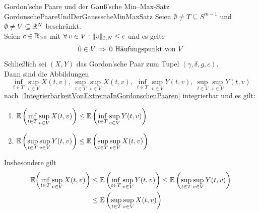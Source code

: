 \begin{satz}{Gordon'sche Paare und der Gauß'sche Min--Max-Satz}
            {GordonschePaareUndDerGaussscheMinMaxSatz}
Seien $\emptyset \neq T \subseteq S^{m-1}$ und 
$\emptyset\neq V \subseteq \mathbb{R}^N$ beschränkt.\\
Seien $c \in \mathbb{R}_{>0}$ mit $\forall\, v \in V: \lVert v\rVert _{2,N} \le c$ und es gelte
\[0 \in V \, \Rightarrow \, 0 \text{ Häufungspunkt von }V\]
Schließlich sei $(X,Y)$ das Gordon'sche Paar zum Tupel $(\gamma,\delta,g,c)$.\\
Dann sind die Abbildungen
\[\inf_{t \in T}\sup_{v \in V}X(t, v),\  \sup_{t \in T}\sup_{v \in V}X(t, v),\ 
\inf_{t \in T}\sup_{v \in V}Y(t, v),\  \sup_{t \in T}\sup_{v \in V}Y(t, v)\]
nach~\ref{IntegrierbarkeitVonExtremaInGordonschenPaaren} integrierbar und es
gilt:
\begin{enumerate}[(1)]
	\item \label{GordonschePaareUndDerGaussscheMinMaxSatz1}
	$  \mathbb{E}\left(\underset{t \in T}\inf\,\underset{v\in V}\sup\,X(t, v)\right)
	\le\mathbb{E}\left(\underset{t \in T}\inf\,\underset{v\in V}\sup\,Y(t, v)\right)$
	\item \label{GordonschePaareUndDerGaussscheMinMaxSatz2}
	$  \mathbb{E}\left(\underset{t \in T}\sup\,\underset{v\in V}\sup\,Y(t, v)\right)
	\le\mathbb{E}\left(\underset{t \in T}\sup\,\underset{v\in V}\sup\,X(t, v)\right)$
\end{enumerate}
Insbesondere gilt
\begin{align*}
\mathbb{E}\bigg(\underset{t \in T}\inf\,\underset{v\in V}\sup\,X(t, v)\bigg) & \le 
\mathbb{E}\left(\underset{t \in T}\inf\,\underset{v\in V}\sup\,Y(t, v)\right) \le 
\mathbb{E}\left(\underset{t \in T}\sup\,\underset{v\in V}\sup\,Y(t, v)\right)\\& \le
\mathbb{E}\left(\underset{t \in T}\sup\,\underset{v\in V}\sup\,X(t, v)\right)
\end{align*}
\end{satz}
